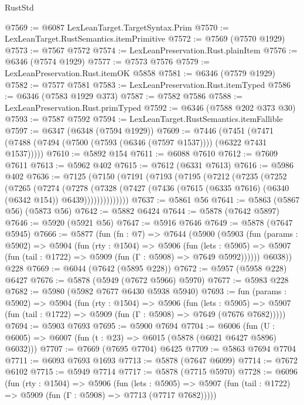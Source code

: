 \begin{lexlean}{RustStd}
\begin{coremodule}
@7569 := @6087 LexLeanTarget.TargetSyntax.Prim
@7570 := LexLeanTarget.RustSemantics.itemPrimitive
@7572 := @7569 (@7570 @1929)
@7573 := @7567 @7572
@7574 := LexLeanPreservation.Rust.plainItem
@7576 := @6346 (@7574 @1929)
@7577 := @7573 @7576
@7579 := LexLeanPreservation.Rust.itemOK @5858
@7581 := @6346 (@7579 @1929)
@7582 := @7577 @7581
@7583 := LexLeanPreservation.Rust.itemTyped
@7586 := @6346 (@7583 @1929 @373)
@7587 := @7582 @7586
@7588 := LexLeanPreservation.Rust.primTyped
@7592 := @6346 (@7588 @202 @373 @30)
@7593 := @7587 @7592
@7594 := LexLeanTarget.RustSemantics.itemFallible
@7597 := @6347 (@6348 (@7594 @1929))
@7609 := @7446
    (@7451 (@7471 (@7488 (@7494 (@7500 (@7593 (@6346 (@7597 @1537)))) (@6322 @7431 @1537)))))
@7610 := @5892 @154
@7611 := @6088 @7610
@7612 := @7609 @7611
@7613 := @5962 @402
@7615 := @7612 (@6331 @7613)
@7616 := @5986 @402
@7636 := @7125
    (@7150
      (@7191
        (@7193
          (@7195
            (@7212
              (@7235
                (@7252
                  (@7265
                    (@7274
                      (@7278
                        (@7328
                          (@7427
                            (@7436 (@7615 (@6335 @7616) (@6340 (@6342 @154)) @6439))))))))))))))
@7637 := @5861 @56
@7641 := @5863 (@5867 @56) (@5873 @56)
@7642 := @5882 @6424
@7644 := @5878 (@7642 @5897)
@7646 := @5920 (@5921 @56)
@7647 := @5916 @7646
@7649 := @5878 (@7647 @5945)
@7666 := @5877
    (fun (fn : @7) =>
    @7644
      (@5900
        (@5903
          (fun (params : @5902) =>
          @5904
            (fun (rty : @1504) =>
            @5906
              (fun (lets : @5905) =>
              @5907 (fun (tail : @1722) => @5909 (fun (Γ : @5908) => @7649 @5992))))))
        @6038))
    @228
@7669 := @6044 (@7642 (@5895 @228))
@7672 := @5957 (@5958 @228) @6427
@7676 := @5878 (@5949 (@7672 @5966) @5970)
@7677 := @5983 @228
@7682 := @5980 (@5982 @7677 @6430 @5938 @5940)
@7693 := fun (params : @5902) =>
  @5904
    (fun (rty : @1504) =>
    @5906
      (fun (lets : @5905) =>
      @5907 (fun (tail : @1722) => @5909 (fun (Γ : @5908) => @7649 (@7676 @7682)))))
@7694 := @5903 @7693
@7695 := @5900 @7694
@7704 := @6006 (fun (U : @6005) => @6007 (fun (t : @23) => @6015 (@5878 (@6021 @6427 @5896) @6032)))
@7707 := @7669 (@7695 @7704) @6425
@7709 := @5863 @7694 @7704
@7711 := @6093 @7693 @1693
@7713 := @5878 (@7647 @6099)
@7714 := @7672 @6102
@7715 := @5949 @7714
@7717 := @5878 (@7715 @5970)
@7728 := @6096
    (fun (rty : @1504) =>
    @5906
      (fun (lets : @5905) =>
      @5907 (fun (tail : @1722) => @5909 (fun (Γ : @5908) => @7713 (@7717 @7682)))))

\end{coremodule}
\end{lexlean}

